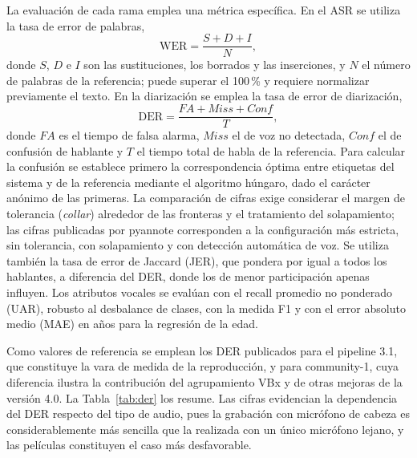 \documentclass[11pt,a4paper]{article}
\newcommand{\lang}[1]{\textit{#1}}
\begin{document}
La evaluación de cada rama emplea una métrica específica. En el ASR se utiliza la tasa de error de palabras,
\begin{equation}
\mathrm{WER}=\frac{S+D+I}{N},
\end{equation}
donde $S$, $D$ e $I$ son las sustituciones, los borrados y las inserciones, y $N$ el número de palabras de la referencia; puede superar el 100\,\% y requiere normalizar previamente el texto. En la diarización se emplea la tasa de error de diarización,
\begin{equation}
\mathrm{DER}=\frac{FA+\mathit{Miss}+\mathit{Conf}}{T},
\end{equation}
donde $FA$ es el tiempo de falsa alarma, $\mathit{Miss}$ el de voz no detectada, $\mathit{Conf}$ el de confusión de hablante y $T$ el tiempo total de habla de la referencia. Para calcular la confusión se establece primero la correspondencia óptima entre etiquetas del sistema y de la referencia mediante el algoritmo húngaro, dado el carácter anónimo de las primeras. La comparación de cifras exige considerar el margen de tolerancia (\lang{collar}) alrededor de las fronteras y el tratamiento del solapamiento; las cifras publicadas por pyannote corresponden a la configuración más estricta, sin tolerancia, con solapamiento y con detección automática de voz. Se utiliza también la tasa de error de Jaccard (JER), que pondera por igual a todos los hablantes, a diferencia del DER, donde los de menor participación apenas influyen. Los atributos vocales se evalúan con el recall promedio no ponderado (UAR), robusto al desbalance de clases, con la medida F1 y con el error absoluto medio (MAE) en años para la regresión de la edad.

Como valores de referencia se emplean los DER publicados para el pipeline 3.1, que constituye la vara de medida de la reproducción, y para community-1, cuya diferencia ilustra la contribución del agrupamiento VBx y de otras mejoras de la versión 4.0. La Tabla~\ref{tab:der} los resume. Las cifras evidencian la dependencia del DER respecto del tipo de audio, pues la grabación con micrófono de cabeza es considerablemente más sencilla que la realizada con un único micrófono lejano, y las películas constituyen el caso más desfavorable.
\end{document}
